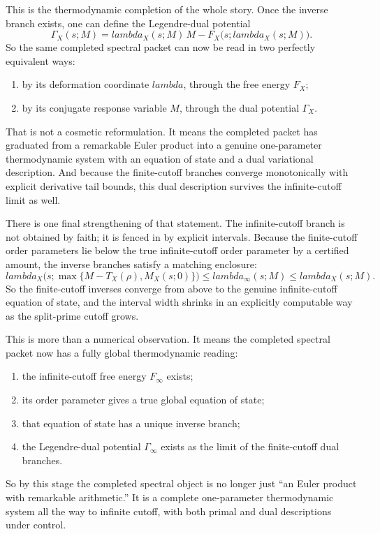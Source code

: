 \documentclass[11pt]{article}
\def\mathcal#1{#1}%
\def\lambda{lambda}%
\begin{document}
This is the thermodynamic completion of the whole story. Once the inverse branch exists, one can define the Legendre-dual potential
\[
\Gamma_X(s;M)=\lambda_X(s;M)\,M-\mathcal F_X\bigl(s;\lambda_X(s;M)\bigr).
\]
So the same completed spectral packet can now be read in two perfectly equivalent ways:
\begin{enumerate}
\item by its deformation coordinate $\lambda$, through the free energy $\mathcal F_X$;
\item by its conjugate response variable $M$, through the dual potential $\Gamma_X$.
\end{enumerate}
That is not a cosmetic reformulation. It means the completed packet has graduated from a remarkable Euler product into a genuine one-parameter thermodynamic system with an equation of state and a dual variational description. And because the finite-cutoff branches converge monotonically with explicit derivative tail bounds, this dual description survives the infinite-cutoff limit as well.

There is one final strengthening of that statement. The infinite-cutoff branch is not obtained by faith; it is fenced in by explicit intervals. Because the finite-cutoff order parameters lie below the true infinite-cutoff order parameter by a certified amount, the inverse branches satisfy a matching enclosure:
\[
\lambda_X\bigl(s;\max\{M-T_X(\rho),\mathcal M_X(s;0)\}\bigr)
\le
\lambda_\infty(s;M)
\le
\lambda_X(s;M).
\]
So the finite-cutoff inverses converge from above to the genuine infinite-cutoff equation of state, and the interval width shrinks in an explicitly computable way as the split-prime cutoff grows.

This is more than a numerical observation. It means the completed spectral packet now has a fully global thermodynamic reading:
\begin{enumerate}
\item the infinite-cutoff free energy $\mathcal F_\infty$ exists;
\item its order parameter gives a true global equation of state;
\item that equation of state has a unique inverse branch;
\item the Legendre-dual potential $\Gamma_\infty$ exists as the limit of the finite-cutoff dual branches.
\end{enumerate}
So by this stage the completed spectral object is no longer just “an Euler product with remarkable arithmetic.” It is a complete one-parameter thermodynamic system all the way to infinite cutoff, with both primal and dual descriptions under control.
\end{document}
